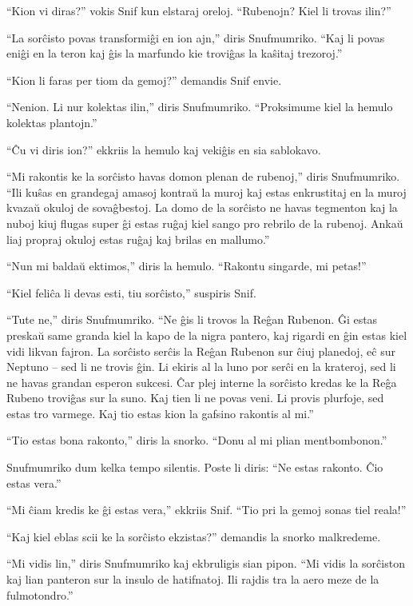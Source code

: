 ``Kion vi diras?'' vokis Snif kun elstaraj oreloj. ``Rubenojn? Kiel li trovas ilin?''

``La sorĉisto povas transformiĝi en ion ajn,'' diris Snufmumriko. ``Kaj li povas eniĝi en la teron kaj ĝis la marfundo kie troviĝas la kaŝitaj trezoroj.''

``Kion li faras per tiom da gemoj?'' demandis Snif envie.

``Nenion. Li nur kolektas ilin,'' diris Snufmumriko. ``Proksimume kiel la hemulo kolektas plantojn.''

``Ĉu vi diris ion?'' ekkriis la hemulo kaj vekiĝis en sia sablokavo.

``Mi rakontis ke la sorĉisto havas domon plenan de rubenoj,'' diris Snufmumriko. ``Ili kuŝas en grandegaj amasoj kontraŭ la muroj kaj estas enkrustitaj en la muroj kvazaŭ okuloj de sovaĝbestoj. La domo de la sorĉisto ne havas tegmenton kaj la nuboj kiuj flugas super ĝi estas ruĝaj kiel sango pro rebrilo de la rubenoj. Ankaŭ liaj propraj okuloj estas ruĝaj kaj brilas en mallumo.''

``Nun mi baldaŭ ektimos,'' diris la hemulo. ``Rakontu singarde, mi petas!''

``Kiel feliĉa li devas esti, tiu sorĉisto,'' suspiris Snif.

``Tute ne,'' diris Snufmumriko. ``Ne ĝis li trovos la Reĝan Rubenon. Ĝi estas preskaŭ same granda kiel la kapo de la nigra pantero, kaj rigardi en ĝin estas kiel vidi likvan fajron. La sorĉisto serĉis la Reĝan Rubenon sur ĉiuj planedoj, eĉ sur Neptuno -- sed li ne trovis ĝin. Li ekiris al la luno por serĉi en la krateroj, sed li ne havas grandan esperon sukcesi. Ĉar plej interne la sorĉisto kredas ke la Reĝa Rubeno troviĝas sur la suno. Kaj tien li ne povas veni. Li provis plurfoje, sed estas tro varmege. Kaj tio estas kion la gafsino rakontis al mi.''

``Tio estas bona rakonto,'' diris la snorko. ``Donu al mi plian mentbombonon.''

Snufmumriko dum kelka tempo silentis. Poste li diris: ``Ne estas rakonto. Ĉio estas vera.''

``Mi ĉiam kredis ke ĝi estas vera,'' ekkriis Snif. ``Tio pri la gemoj sonas tiel reala!''

``Kaj kiel eblas scii ke la sorĉisto ekzistas?'' demandis la snorko malkredeme.

``Mi vidis lin,'' diris Snufmumriko kaj ekbruligis sian pipon. ``Mi vidis la sorĉiston kaj lian panteron sur la insulo de hatifnatoj. Ili rajdis tra la aero meze de la fulmotondro.''

